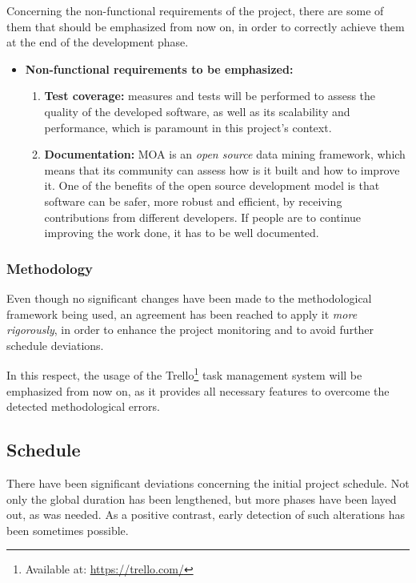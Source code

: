 Concerning the non-functional requirements of the project, there are some of them that should be emphasized from now on, in order to correctly achieve them at the end of the development phase.

\begin{itemize}
	\item \textbf{Non-functional requirements to be emphasized:}
	\begin{enumerate}
		\item \textbf{Test coverage:} measures and tests will be performed to assess the quality of the developed software, as well as its scalability and performance, which is paramount in this project’s context.
		\item \textbf{Documentation:} MOA is an \textit{open source} data mining framework, which means that its community can assess how is it built and how to improve it. One of the benefits of the open source development model is that software can be safer, more robust and efficient, by receiving contributions from different developers. If people are to continue improving the work done, it has to be well documented.
	\end{enumerate}
\end{itemize}

\subsubsection{Methodology}

Even though no significant changes have been made to the methodological framework being used, an agreement has been reached to apply it \textit{more rigorously}, in order to enhance the project monitoring and to avoid further schedule deviations.

In this respect, the usage of the Trello\footnote{Available at: \url{https://trello.com/}} task management system will be emphasized from now on, as it provides all necessary features to overcome the detected methodological errors.

\subsection{Schedule}
\label{section:schedule}

There have been significant deviations concerning the initial project schedule. Not only the global duration has been lengthened, but more phases have been layed out, as was needed. As a positive contrast, early detection of such alterations has been sometimes possible.

